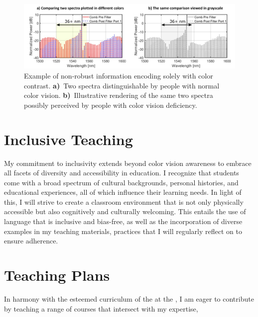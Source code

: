 \begin{figure}[!ht]%
    \centering
    \includegraphics[width=0.9\linewidth]{../../fig/color.pdf}
    \caption{Example of non-robust information encoding solely with color contrast. \textbf{a)}~Two spectra distinguishable by people with normal color vision. \textbf{b)}~Illustrative rendering of the same two spectra possibly perceived by people with color vision deficiency.}
    \label{fig:color}
\end{figure}

\section{Inclusive Teaching}
My commitment to inclusivity extends beyond color vision awareness to embrace all facets of diversity and accessibility in education. I recognize that students come with a broad spectrum of cultural backgrounds, personal histories, and educational experiences, all of which influence their learning needs. In light of this, I will strive to create a classroom environment that is not only physically accessible but also cognitively and culturally welcoming. This entails the use of language that is inclusive and bias-free, as well as the incorporation of diverse examples in my teaching materials, practices that I will regularly reflect on to ensure adherence.


\section{Teaching Plans}
In harmony with the esteemed curriculum of the \appDept{} at the \appSchool{}, I am eager to contribute by teaching a range of courses that intersect with my expertise,%
